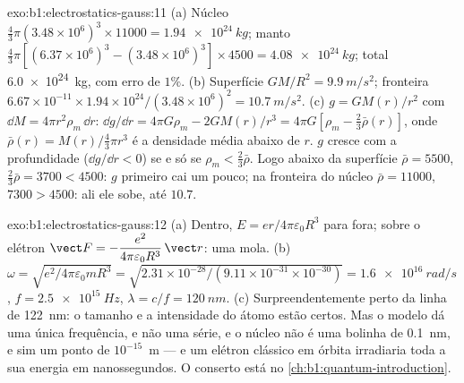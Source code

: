 \begin{solution}{exo:b1:electrostatics-gauss:11}
(a) Núcleo $\tfrac43\pi(3.48 \times 10^6)^3 \times 11000 = \qty{1.94e24}{kg}$; manto
$\tfrac43\pi[(6.37 \times 10^6)^3 - (3.48 \times 10^6)^3] \times 4500 = \qty{4.08e24}{kg}$;
total \qty{6.0e24}{kg}, com erro de $1\%$. (b) Superfície $GM/R^2 = \qty{9.9}{m/s^2}$;
fronteira $6.67 \times 10^{-11} \times 1.94 \times 10^{24}/(3.48 \times 10^6)^2 =
\qty{10.7}{m/s^2}$. (c) $g = GM(r)/r^2$ com $\dd M = 4\pi r^2\rho_m\,\dd r$:
$\dd g/\dd r = 4\pi G\rho_m - 2GM(r)/r^3 = 4\pi G[\rho_m - \tfrac23\bar\rho(r)]$,
onde $\bar\rho(r) = M(r)/\tfrac43\pi r^3$ é a densidade média abaixo de $r$.
$g$ cresce com a profundidade ($\dd g/\dd r < 0$) se e só se $\rho_m < \tfrac23\bar\rho$. Logo
abaixo da superfície $\bar\rho = 5500$, $\tfrac23\bar\rho = 3700 < 4500$: $g$
primeiro cai um pouco; na fronteira do núcleo $\bar\rho = 11000$, $7300 >
4500$: ali ele sobe, até $10.7$.
\end{solution}

\begin{solution}{exo:b1:electrostatics-gauss:12}
(a) Dentro, $E = er/4\pi\varepsilon_0R^3$ para fora; sobre o elétron $\vect F =
-\dfrac{e^2}{4\pi\varepsilon_0R^3}\,\vect r$: uma mola. (b) $\omega = \sqrt{e^2/4\pi\varepsilon_0mR^3}
= \sqrt{2.31 \times 10^{-28}/(9.11 \times 10^{-31} \times 10^{-30})} = \qty{1.6e16}{rad/s}$,
$f = \qty{2.5e15}{Hz}$, $\lambda = c/f = \qty{120}{nm}$. (c) Surpreendentemente perto
da linha de \qty{122}{nm}: o tamanho e a intensidade do átomo estão certos.
Mas o modelo dá uma única frequência, e não uma série, e o núcleo não é
uma bolinha de \qty{0.1}{nm}, e sim um ponto de $10^{-15}$~m --- e um elétron
clássico em órbita irradiaria toda a sua energia em nanossegundos. O
conserto está no \cref{ch:b1:quantum-introduction}.
\end{solution}


